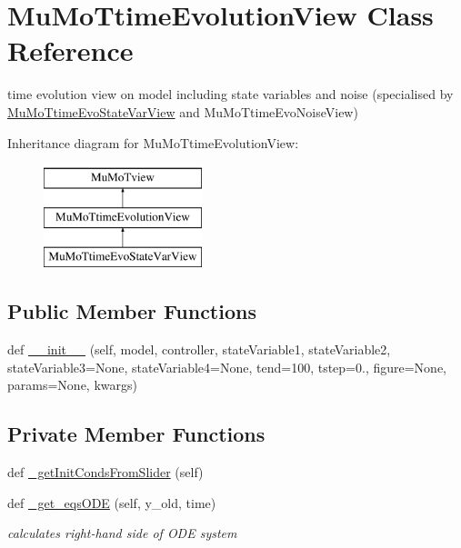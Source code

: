 \hypertarget{class_mu_mo_t_1_1_mu_mo_t_1_1_mu_mo_ttime_evolution_view}{}\section{Mu\+Mo\+Ttime\+Evolution\+View Class Reference}
\label{class_mu_mo_t_1_1_mu_mo_t_1_1_mu_mo_ttime_evolution_view}


time evolution view on model including state variables and noise (specialised by \hyperlink{class_mu_mo_t_1_1_mu_mo_t_1_1_mu_mo_ttime_evo_state_var_view}{Mu\+Mo\+Ttime\+Evo\+State\+Var\+View} and Mu\+Mo\+Ttime\+Evo\+Noise\+View)  


Inheritance diagram for Mu\+Mo\+Ttime\+Evolution\+View\+:\begin{figure}[H]
\begin{center}
\leavevmode
\includegraphics[height=3.000000cm]{class_mu_mo_t_1_1_mu_mo_t_1_1_mu_mo_ttime_evolution_view}
\end{center}
\end{figure}
\subsection*{Public Member Functions}
\begin{DoxyCompactItemize}
\item 
def \hyperlink{class_mu_mo_t_1_1_mu_mo_t_1_1_mu_mo_ttime_evolution_view_a5e770e35882c7ca31a269958f19a6850}{\+\_\+\+\_\+init\+\_\+\+\_\+} (self, model, controller, state\+Variable1, state\+Variable2, state\+Variable3=None, state\+Variable4=None, tend=100, tstep=0., figure=None, params=None, kwargs)
\end{DoxyCompactItemize}
\subsection*{Private Member Functions}
\begin{DoxyCompactItemize}
\item 
def \hyperlink{class_mu_mo_t_1_1_mu_mo_t_1_1_mu_mo_ttime_evolution_view_ae0c30bb947416bd557c983fe668513a8}{\+\_\+get\+Init\+Conds\+From\+Slider} (self)
\item 
def \hyperlink{class_mu_mo_t_1_1_mu_mo_t_1_1_mu_mo_ttime_evolution_view_ac73bb501e7bfd03ba030d3ec04688232}{\+\_\+get\+\_\+eqs\+O\+DE} (self, y\+\_\+old, time)
\begin{DoxyCompactList}\small\item\em calculates right-\/hand side of O\+DE system \end{DoxyCompactList}\end{DoxyCompactItemize}
